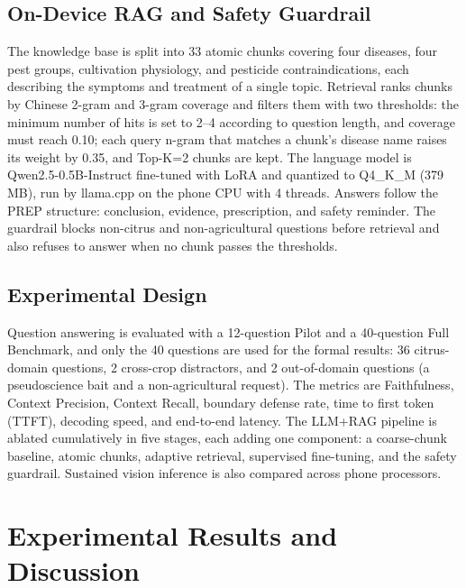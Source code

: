 \documentclass[10pt,twocolumn,a4paper]{article}
\begin{document}
\subsection{On-Device RAG and Safety Guardrail}
The knowledge base is split into 33 atomic chunks covering four diseases, four pest groups, cultivation physiology, and pesticide contraindications, each describing the symptoms and treatment of a single topic. Retrieval ranks chunks by Chinese 2-gram and 3-gram coverage and filters them with two thresholds: the minimum number of hits is set to 2–4 according to question length, and coverage must reach 0.10; each query n-gram that matches a chunk's disease name raises its weight by 0.35, and Top-K=2 chunks are kept. The language model is Qwen2.5-0.5B-Instruct fine-tuned with LoRA and quantized to Q4\_K\_M (379 MB), run by llama.cpp on the phone CPU with 4 threads. Answers follow the PREP structure: conclusion, evidence, prescription, and safety reminder. The guardrail blocks non-citrus and non-agricultural questions before retrieval and also refuses to answer when no chunk passes the thresholds.

\subsection{Experimental Design}
Question answering is evaluated with a 12-question Pilot and a 40-question Full Benchmark, and only the 40 questions are used for the formal results: 36 citrus-domain questions, 2 cross-crop distractors, and 2 out-of-domain questions (a pseudoscience bait and a non-agricultural request). The metrics are Faithfulness, Context Precision, Context Recall, boundary defense rate, time to first token (TTFT), decoding speed, and end-to-end latency. The LLM+RAG pipeline is ablated cumulatively in five stages, each adding one component: a coarse-chunk baseline, atomic chunks, adaptive retrieval, supervised fine-tuning, and the safety guardrail. Sustained vision inference is also compared across phone processors.

\section{Experimental Results and Discussion}
\end{document}
